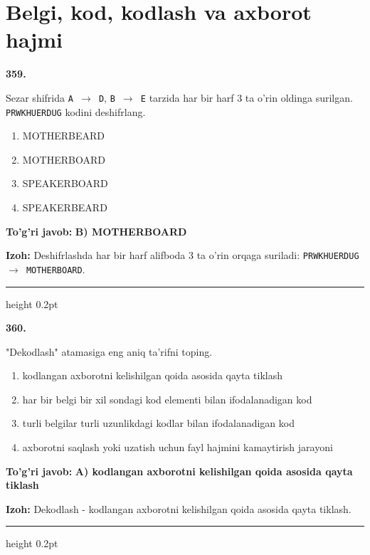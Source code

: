 \documentclass[10pt,a4paper,oneside]{article}
\begin{document}
\section{Belgi, kod, kodlash va axborot hajmi}

\noindent\textbf{\color{ink}359.}
\par
Sezar shifrida \texttt{A \ensuremath{\to} D}, \texttt{B \ensuremath{\to} E} tarzida har bir harf 3 ta o'rin oldinga surilgan. \texttt{PRWKHUERDUG} kodini deshifrlang.
\begin{enumerate}[label=\Alph*),leftmargin=9mm]
\item MOTHERBEARD
\item MOTHERBOARD
\item SPEAKERBOARD
\item SPEAKERBEARD
\end{enumerate}
\begin{tcolorbox}[enhanced,breakable,colback=teal!4,colframe=teal!50!black,boxrule=0.5pt,arc=1.1mm,left=3mm,right=3mm,top=1.7mm,bottom=1.7mm,before skip=2mm,after skip=2mm]
\textbf{\color{teal}To'g'ri javob:} \textbf{B) MOTHERBOARD}
\par\smallskip
\textbf{Izoh:} Deshifrlashda har bir harf alifboda 3 ta o'rin orqaga suriladi: \texttt{PRWKHUERDUG \ensuremath{\to} MOTHERBOARD}.
\end{tcolorbox}
\vspace{2mm}\hrule height 0.2pt \vspace{3mm}

\noindent\textbf{\color{ink}360.}
\par
"Dekodlash" atamasiga eng aniq ta'rifni toping.
\begin{enumerate}[label=\Alph*),leftmargin=9mm]
\item kodlangan axborotni kelishilgan qoida asosida qayta tiklash
\item har bir belgi bir xil sondagi kod elementi bilan ifodalanadigan kod
\item turli belgilar turli uzunlikdagi kodlar bilan ifodalanadigan kod
\item axborotni saqlash yoki uzatish uchun fayl hajmini kamaytirish jarayoni
\end{enumerate}
\begin{tcolorbox}[enhanced,breakable,colback=teal!4,colframe=teal!50!black,boxrule=0.5pt,arc=1.1mm,left=3mm,right=3mm,top=1.7mm,bottom=1.7mm,before skip=2mm,after skip=2mm]
\textbf{\color{teal}To'g'ri javob:} \textbf{A) kodlangan axborotni kelishilgan qoida asosida qayta tiklash}
\par\smallskip
\textbf{Izoh:} Dekodlash - kodlangan axborotni kelishilgan qoida asosida qayta tiklash.
\end{tcolorbox}
\vspace{2mm}\hrule height 0.2pt \vspace{3mm}
\end{document}

